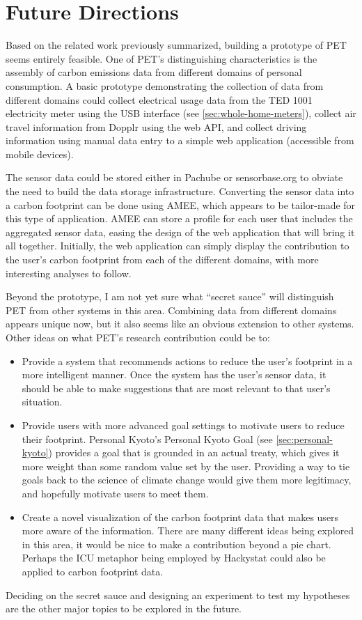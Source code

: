 \chapter{Future Directions}

Based on the related work previously summarized, building a prototype of PET seems entirely feasible. One of PET's distinguishing characteristics is the assembly of carbon emissions data from different domains of personal consumption. A basic prototype demonstrating the collection of data from different domains could collect electrical usage data from the TED 1001 electricity meter using the USB interface (see \autoref{sec:whole-home-meters}), collect air travel information from Dopplr using the web API, and collect driving information using manual data entry to a simple web application (accessible from mobile devices).

The sensor data could be stored either in Pachube or sensorbase.org to obviate the need to build the data storage infrastructure. Converting the sensor data into a carbon footprint can be done using AMEE, which appears to be tailor-made for this type of application. AMEE can store a profile for each user that includes the aggregated sensor data, easing the design of the web application that will bring it all together. Initially, the web application can simply display the contribution to the user's carbon footprint from each of the different domains, with more interesting analyses to follow.

Beyond the prototype, I am not yet sure what ``secret sauce'' will distinguish PET from other systems in this area. Combining data from different domains appears unique now, but it also seems like an obvious extension to other systems. Other ideas on what PET's research contribution could be to:

\begin{itemize}
	\item Provide a system that recommends actions to reduce the user's footprint in a more intelligent manner. Once the system has the user's sensor data, it should be able to make suggestions that are most relevant to that user's situation.
	\item Provide users with more advanced goal settings to motivate users to reduce their footprint. Personal Kyoto's Personal Kyoto Goal (see \autoref{sec:personal-kyoto}) provides a goal that is grounded in an actual treaty, which gives it more weight than some random value set by the user. Providing a way to tie goals back to the science of climate change would give them more legitimacy, and hopefully motivate users to meet them.
	\item Create a novel visualization of the carbon footprint data that makes users more aware of the information. There are many different ideas being explored in this area, it would be nice to make a contribution beyond a pie chart. Perhaps the ICU metaphor being employed by Hackystat could also be applied to carbon footprint data.
\end{itemize}

Deciding on the secret sauce and designing an experiment to test my hypotheses are the other major topics to be explored in the future.